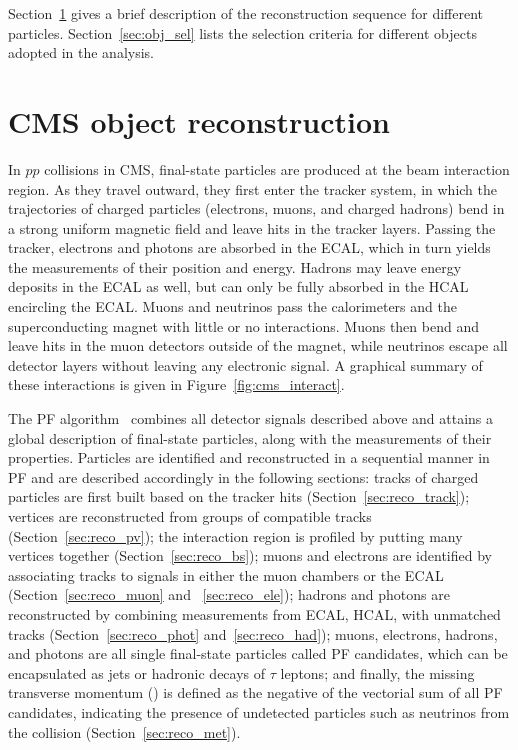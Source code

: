 Section~\ref{sec:obj_reco} gives a brief description of the reconstruction sequence for different particles.
Section~\ref{sec:obj_sel} lists the selection criteria for different objects adopted in the \hmm analysis.


\section{CMS object reconstruction}\label{sec:obj_reco}

In $pp$ collisions in CMS, final-state particles are produced at the beam interaction region. 
As they travel outward, they first enter the tracker system, in which the trajectories of charged particles 
(electrons, muons, and charged hadrons) bend in a strong uniform magnetic field and leave hits in the tracker layers. 
Passing the tracker, electrons and photons are absorbed in the ECAL, which in turn yields the measurements of their position and energy.
Hadrons may leave energy deposits in the ECAL as well, but can only be fully absorbed in the HCAL encircling the ECAL. 
Muons and neutrinos pass the calorimeters and the superconducting magnet with little or no interactions.
Muons then bend and leave hits in the muon detectors outside of the magnet, 
while neutrinos escape all detector layers without leaving any electronic signal.
A graphical summary of these interactions is given in Figure~\ref{fig:cms_interact}.

The PF algorithm~\cite{Sirunyan_2017} combines all detector signals described above and attains a global description of final-state particles, 
along with the measurements of their properties.
Particles are identified and reconstructed in a sequential manner in PF and are described accordingly in the following sections:
tracks of charged particles are first built based on the tracker hits (Section~\ref{sec:reco_track}); 
vertices are reconstructed from groups of compatible tracks (Section~\ref{sec:reco_pv});
the interaction region is profiled by putting many vertices together (Section~\ref{sec:reco_bs});
muons and electrons are identified by associating tracks to signals in either the muon chambers or the ECAL (Section~\ref{sec:reco_muon} and ~\ref{sec:reco_ele});
hadrons and photons are reconstructed by combining measurements from ECAL, HCAL, with unmatched tracks (Section~\ref{sec:reco_phot} and~\ref{sec:reco_had});
muons, electrons, hadrons, and photons are all single final-state particles called PF candidates, 
which can be encapsulated as jets or hadronic decays of $\tau$ leptons;
and finally, the missing transverse momentum (\MET) is defined as the negative of the vectorial sum of all PF candidates,
indicating the presence of undetected particles such as neutrinos from the collision (Section~\ref{sec:reco_met}).

